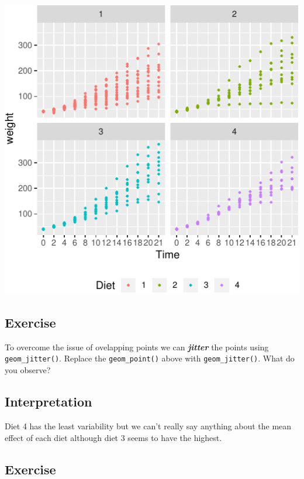 \documentclass[letterpaperpaper,9pt,twocolumn,twoside,printwatermark=false]{pinp}
\begin{document}
\begin{center}\includegraphics{Getting-Started-in-R_files/figure-latex/jitterPlot-1} \end{center}

\hypertarget{exercise-5}{%
\subsection{Exercise}\label{exercise-5}}

To overcome the issue of ovelapping points we can \textbf{\emph{jitter}}
the points using \texttt{geom\_jitter()}. Replace the
\texttt{geom\_point()} above with \texttt{geom\_jitter()}. What do you
observe?

\hypertarget{interpretation-2}{%
\subsection{Interpretation}\label{interpretation-2}}

Diet 4 has the least variability but we can't really say anything about
the mean effect of each diet although diet 3 seems to have the highest.

\hypertarget{exercise-6}{%
\subsection{Exercise}\label{exercise-6}}
\end{document}
